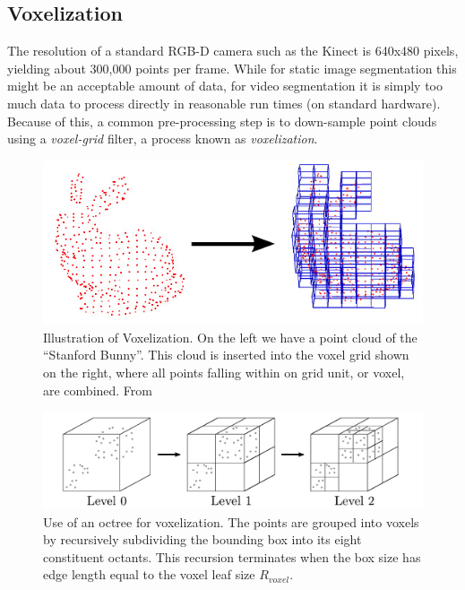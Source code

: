 \subsection{Voxelization}
The resolution of a standard RGB-D camera such as the Kinect is 640x480 pixels, yielding about 300,000 points per frame. While for static image segmentation this might be an acceptable amount of data, for video segmentation it is simply too much data to process directly in reasonable run times (on standard hardware). Because of this, a common pre-processing step is to down-sample point clouds using a \textit{voxel-grid} filter, a process known as \textit{voxelization}. 

\begin{figure}
\begin{center}
\includegraphics[width=0.8\linewidth]{figures/WorldModel/stanford_bunny.png}
\end{center}
   \caption[Example of Voxelization]{Illustration of Voxelization. On the left we have a point cloud of the ``Stanford Bunny''. This cloud is inserted into the voxel grid shown on the right, where all points falling within on grid unit, or voxel, are combined. From \cite{PCLWebsite}}
\label{fig:stanford_bunny}
\end{figure}

\begin{figure}
\begin{center}
\includegraphics[width=\linewidth]{figures/WorldModel/voxel_grid_octree.png}
\end{center}
   \caption[Octree Voxelization]{Use of an octree for voxelization. The points are grouped into voxels by recursively subdividing the bounding box into its eight constituent octants. This recursion terminates when the box size has edge length equal to the voxel leaf size ${R}_{voxel}$.}
\label{fig:stanford_bunny}
\end{figure}

